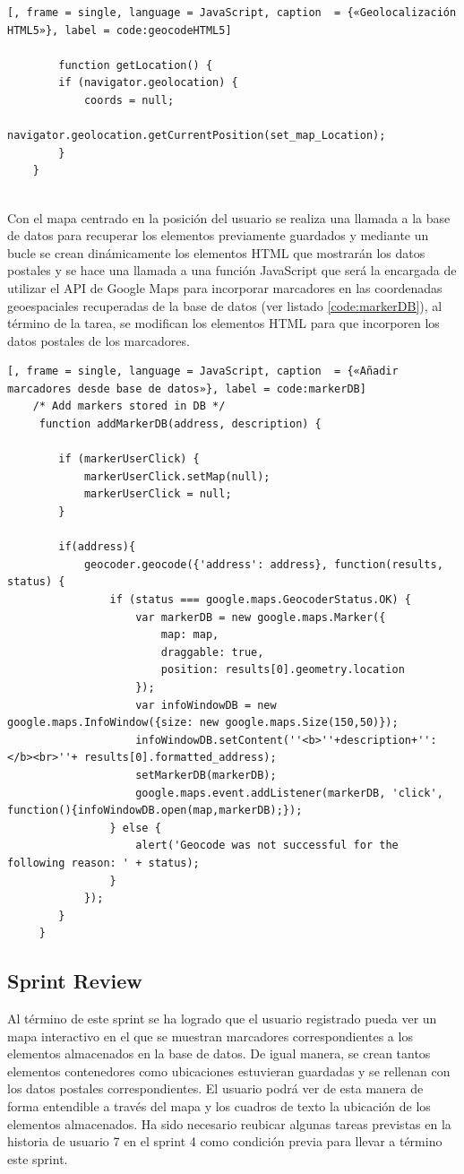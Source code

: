 	 	\begin{lstlisting}[, frame = single, language = JavaScript, caption  = {«Geolocalización HTML5»}, label = code:geocodeHTML5]
		
		function getLocation() {
 		if (navigator.geolocation) {
 			coords = null;
 			navigator.geolocation.getCurrentPosition(set_map_Location);
 		}
 	}
		
	\end{lstlisting}
	 
	Con el mapa centrado en la posición del usuario se realiza una llamada a la base de datos para recuperar los elementos previamente guardados y mediante un bucle se crean dinámicamente los elementos HTML que mostrarán los datos postales  y se hace una llamada a una función JavaScript que será la encargada de utilizar el API de Google Maps para incorporar marcadores en las coordenadas geoespaciales recuperadas de la base de datos (ver listado \ref{code:markerDB}), al término de la tarea, se modifican los elementos HTML para que incorporen los datos postales de los marcadores.
	
		\begin{lstlisting}[, frame = single, language = JavaScript, caption  = {«Añadir marcadores desde base de datos»}, label = code:markerDB]
	/* Add markers stored in DB */
	 function addMarkerDB(address, description) {

	 	if (markerUserClick) {
	 		markerUserClick.setMap(null);
	 		markerUserClick = null;
	 	}

	 	if(address){
	 		geocoder.geocode({'address': address}, function(results, status) {
	 			if (status === google.maps.GeocoderStatus.OK) {
	 				var markerDB = new google.maps.Marker({
	 					map: map,
	 					draggable: true,
	 					position: results[0].geometry.location
	 				});
	 				var infoWindowDB = new google.maps.InfoWindow({size: new google.maps.Size(150,50)});
	 				infoWindowDB.setContent(''<b>''+description+'':</b><br>''+ results[0].formatted_address);
	 				setMarkerDB(markerDB);
	 				google.maps.event.addListener(markerDB, 'click', function(){infoWindowDB.open(map,markerDB);});
	 			} else {
	 				alert('Geocode was not successful for the following reason: ' + status);
	 			}
	 		});
	 	}
	 }
	 \end{lstlisting}
	
	\subsection{Sprint Review}
	Al término de este sprint se ha logrado que el usuario registrado pueda ver un mapa interactivo en el que se muestran marcadores correspondientes a los elementos almacenados en la base de datos. De igual manera, se crean tantos elementos contenedores como ubicaciones estuvieran guardadas y se rellenan con los datos postales correspondientes. El usuario podrá ver de esta manera de forma entendible a través del mapa y los cuadros de texto la ubicación de los elementos almacenados. Ha sido necesario reubicar algunas tareas previstas en la historia de usuario 7 en el sprint 4 como condición previa para llevar a término este sprint.
	
